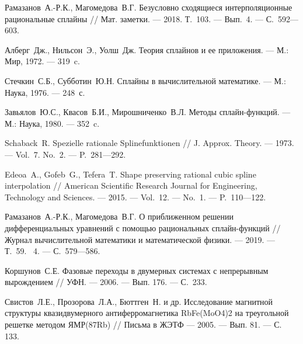\begin{thebibliography}{11}
Рамазанов~А.-Р.К., Магомедова~В.Г. Безусловно сходящиеся интерполяционные рациональные сплайны // Мат. заметки. --- 2018. Т.~103. --- Вып.~4. --- С.~592---603.





Алберг~Дж., Нильсон~Э., Уолш~Дж. Теория сплайнов и ее приложения. --- М.: Мир, 1972. --- 319~c.





Стечкин~С.Б., Субботин~Ю.Н. Сплайны в вычислительной математике.
 --- М.: Наука, 1976. --- 248~с.





Завьялов~Ю.С., Квасов~Б.И., Мирошниченко~В.Л. Методы сплайн-функций.
 --- М.: Наука, 1980. --- 352~c.





Schaback~R.  Spezielle rationale Splinefunktionen // J. Approx. Theory. --- 1973. --- Vol.~7. No.~2. --- P.~281---292.  





Edeoa~A., Gofeb~G., Tefera~T. Shape preserving rational cubic spline interpolation // American Scientific Research Journal for Engineering, Technology and Sciences. --- 2015. --- Vol.~12. --- No.~1. --- P.~110---122.  
 

 





Рамазанов~А.-Р.К., Магомедова~В.Г. О приближенном решении дифференциальных 
уравнений с помощью рациональных сплайн-функций // Журнал вычислительной математики и математической физики. --- 2019. --- Т.~59. \No~4. --- С.~579---586.





Коршунов~С.Е. 
Фазовые переходы в двумерных системах с непрерывным вырождением 
// 
УФН. 
--- 2006.
--- Вып. 176. 
--- С.~233.





Свистов~Л.Е., Прозорова~Л.А., Бюттген~Н. и др. 
Исследование магнитной структуры квазидвумерного антиферромагнетика RbFe(MoO4)2 на треугольной решетке методом ЯМР(87Rb) 
// 
Письма в ЖЭТФ 
--- 2005.
--- Вып. 81.
--- С. 133.






\end{thebibliography}
